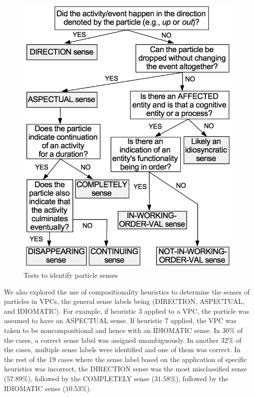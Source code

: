 \documentclass[output=paper
,modfonts
,nonflat]{langsci/langscibook}
\begin{document}
\begin{figure}[ht]
\includegraphics[scale=0.55]{figures/block_sense_uppercase}
\caption{Tests to identify particle senses}\label{fig:tests-senses}
\end{figure}



We also explored the use of compositionality heuristics to determine the senses of particles in VPCs, the general sense labels being (DIRECTION, ASPECTUAL, and IDIOMATIC). For example, if heuristic 3 applied to a VPC, the particle was assumed to have an ASPECTUAL sense. If heuristic 7 applied, the VPC was taken to be noncompositional and hence with an IDIOMATIC sense. In $30\%$ of the cases, a correct sense label was assigned unambiguously. In another $32\%$ of the cases, multiple sense labels were identified and one of them was correct. In the rest of the 19 cases where the sense label based on the application of specific heuristics was incorrect, the DIRECTION sense was the most misclassified sense ($57.89\%$), followed by the COMPLETELY sense ($31.58\%$), followed by the IDIOMATIC sense ($10.53\%$).
\end{document}

